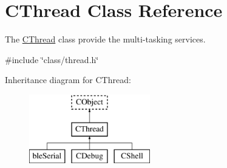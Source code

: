 \hypertarget{class_c_thread}{\section{C\-Thread Class Reference}
\label{class_c_thread}
}


The \hyperlink{class_c_thread}{C\-Thread} class provide the multi-\/tasking services.  




{\ttfamily \#include \char`\"{}class/thread.\-h\char`\"{}}

Inheritance diagram for C\-Thread\-:\begin{figure}[H]
\begin{center}
\leavevmode
\includegraphics[height=3.000000cm]{d0/d26/class_c_thread}
\end{center}
\end{figure}
